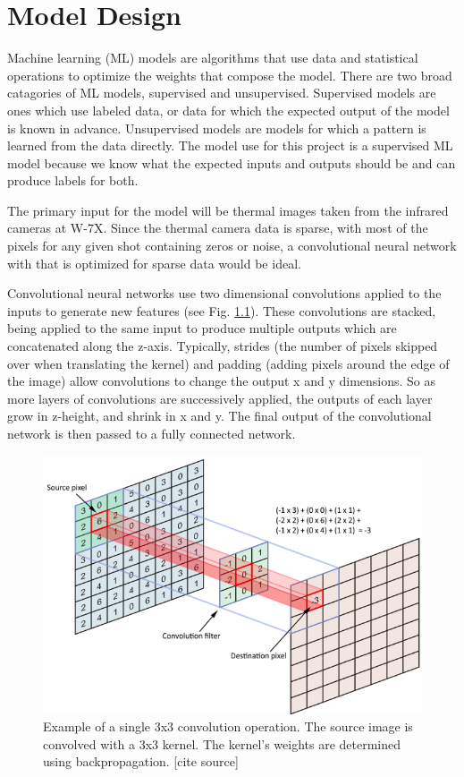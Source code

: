 %
\chapter{Model Design}
\label{sec:code:model}

Machine learning (ML) models are algorithms that use data and statistical operations to optimize the weights that compose the model. There are two broad catagories of ML models, supervised and unsupervised. Supervised models are ones which use labeled data, or data for which the expected output of the model is known in advance. Unsupervised models are models for which a pattern is learned from the data directly. The model use for this project is a supervised ML model because we know what the expected inputs and outputs should be and can produce labels for both.

The primary input for the model will be thermal images taken from the infrared cameras at W-7X. Since the thermal camera data is sparse, with most of the pixels for any given shot containing zeros or noise, a convolutional neural network with that is optimized for sparse data would be ideal.

Convolutional neural networks use two dimensional convolutions applied to the inputs to generate new features (see Fig. \ref{fig:code:2DConv}). These convolutions are stacked, being applied to the same input to produce multiple outputs which are concatenated along the z-axis. Typically, strides (the number of pixels skipped over when translating the kernel) and padding (adding pixels around the edge of the image) allow convolutions to change the output x and y dimensions. So as more layers of convolutions are successively applied, the outputs of each layer grow in z-height, and shrink in x and y. The final output of the convolutional network is then passed to a fully connected network.


\begin{figure}[htb]
    \includegraphics[width=\textwidth]{images/2d-Conv.png}
    \caption{Example of a single 3x3 convolution operation. The source image is convolved with a 3x3 kernel. The kernel's weights are determined using backpropagation. [cite source]}
    \label{fig:code:2DConv}
\end{figure}

